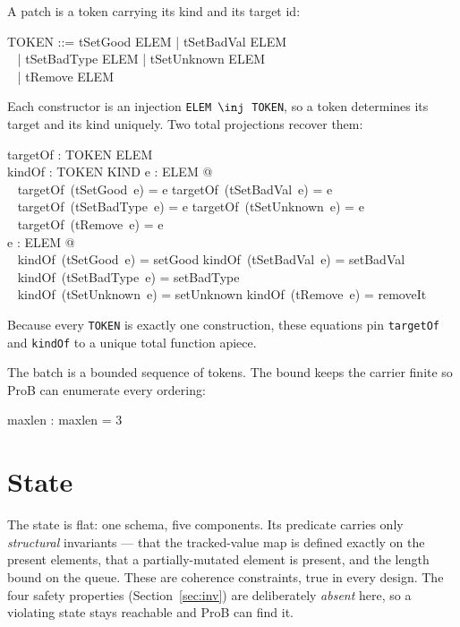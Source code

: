 \documentclass[a4paper,10pt,fleqn]{article}
\begin{document}
A patch is a token carrying its kind and its target id:

\begin{zed}
  TOKEN ::= tSetGood \ldata ELEM \rdata | tSetBadVal \ldata ELEM \rdata \\
  \quad~ | tSetBadType \ldata ELEM \rdata | tSetUnknown \ldata ELEM \rdata \\
  \quad~ | tRemove \ldata ELEM \rdata
\end{zed}

Each constructor is an injection \texttt{ELEM $\inj$ TOKEN}, so a token
determines its target and its kind uniquely.  Two total projections
recover them:

\begin{axdef}
  targetOf : TOKEN \fun ELEM \\
  kindOf : TOKEN \fun KIND
\where
  \forall e : ELEM @ \\
  \quad~ targetOf~(tSetGood~e) = e \land targetOf~(tSetBadVal~e) = e \land \\
  \quad~ targetOf~(tSetBadType~e) = e \land targetOf~(tSetUnknown~e) = e \land \\
  \quad~ targetOf~(tRemove~e) = e \\
  \forall e : ELEM @ \\
  \quad~ kindOf~(tSetGood~e) = setGood \land kindOf~(tSetBadVal~e) = setBadVal \land \\
  \quad~ kindOf~(tSetBadType~e) = setBadType \land \\
  \quad~ kindOf~(tSetUnknown~e) = setUnknown \land kindOf~(tRemove~e) = removeIt
\end{axdef}

Because every \texttt{TOKEN} is exactly one construction, these equations
pin \texttt{targetOf} and \texttt{kindOf} to a unique total function apiece.

The batch is a bounded sequence of tokens.  The bound keeps the carrier
finite so ProB can enumerate every ordering:

\begin{axdef}
  maxlen : \nat
\where
  maxlen = 3
\end{axdef}

\section{State}

The state is flat: one schema, five components.  Its predicate carries only
\emph{structural} invariants --- that the tracked-value map is defined
exactly on the present elements, that a partially-mutated element is
present, and the length bound on the queue.  These are coherence
constraints, true in every design.  The four safety properties
(Section~\ref{sec:inv}) are deliberately \emph{absent} here, so a violating
state stays reachable and ProB can find it.
\end{document}
